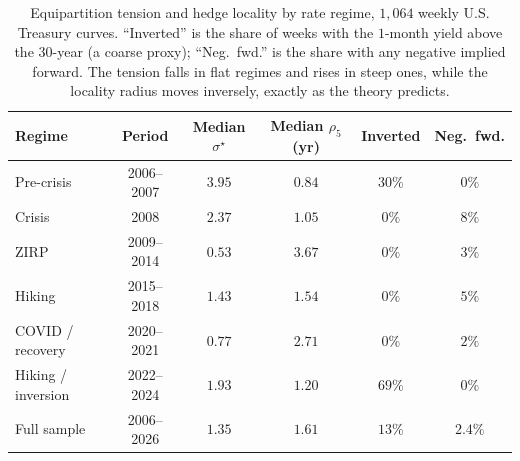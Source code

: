 \documentclass[10pt]{article}
\begin{document}
\begin{table}[h]\centering\small
\begin{tabular}{lccccc}
\hline
Regime & Period & Median $\sigma^\star$ & Median $\rho_5$ (yr) & Inverted & Neg.\ fwd.\\
\hline
Pre-crisis      & 2006--2007 & $3.95$ & $0.84$ & $30\%$ & $0\%$\\
Crisis          & 2008       & $2.37$ & $1.05$ & $0\%$  & $8\%$\\
ZIRP            & 2009--2014 & $0.53$ & $3.67$ & $0\%$  & $3\%$\\
Hiking          & 2015--2018 & $1.43$ & $1.54$ & $0\%$  & $5\%$\\
COVID / recovery& 2020--2021 & $0.77$ & $2.71$ & $0\%$  & $2\%$\\
Hiking / inversion & 2022--2024 & $1.93$ & $1.20$ & $69\%$ & $0\%$\\
\hline
Full sample     & 2006--2026 & $1.35$ & $1.61$ & $13\%$ & $2.4\%$\\
\hline
\end{tabular}
\caption{Equipartition tension and hedge locality by rate regime, $1{,}064$ weekly U.S. Treasury
curves. ``Inverted'' is the share of weeks with the $1$-month yield above the $30$-year (a coarse
proxy); ``Neg.\ fwd.'' is the share with any negative implied forward. The tension falls in flat
regimes and rises in steep ones, while the locality radius moves inversely, exactly as the theory
predicts.}\label{tab:history}
\end{table}
\end{document}
